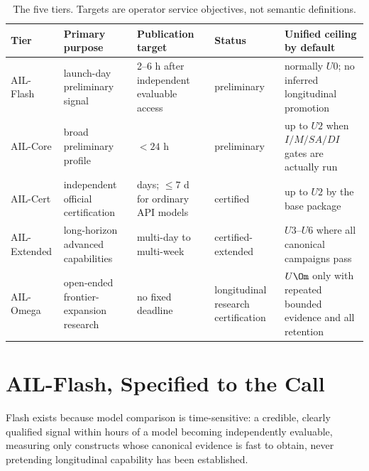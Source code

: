 \begin{table}[!htbp]
\centering\small
\begin{tabularx}{\textwidth}{@{}l Y p{3.0cm} l Y@{}}
\toprule
Tier & Primary purpose & Publication target & Status & Unified ceiling by default \\
\midrule
AIL-Flash & launch-day preliminary signal & 2--6 h after independent evaluable access & preliminary & normally $U0$; no inferred longitudinal promotion \\
AIL-Core & broad preliminary profile & $<24$ h & preliminary & up to $U2$ when $I/M/SA/DI$ gates are actually run \\
AIL-Cert & independent official certification & days; $\le 7$ d for ordinary API models & certified & up to $U2$ by the base package \\
AIL-Extended & long-horizon advanced capabilities & multi-day to multi-week & certified-extended & $U3$--$U6$ where all canonical campaigns pass \\
AIL-Omega & open-ended frontier-expansion research & no fixed deadline & longitudinal research certification & $U\Om$ only with repeated bounded evidence and all retention \\
\bottomrule
\end{tabularx}
\caption{The five tiers. Targets are operator service objectives, not semantic definitions.}
\label{tab:tiers}
\end{table}

\section{AIL-Flash, Specified to the Call}\label{sec:flash}

Flash exists because model comparison is time-sensitive: a credible, clearly qualified signal within hours of a model becoming independently evaluable, measuring only constructs whose canonical evidence is fast to obtain, never pretending longitudinal capability has been established.

